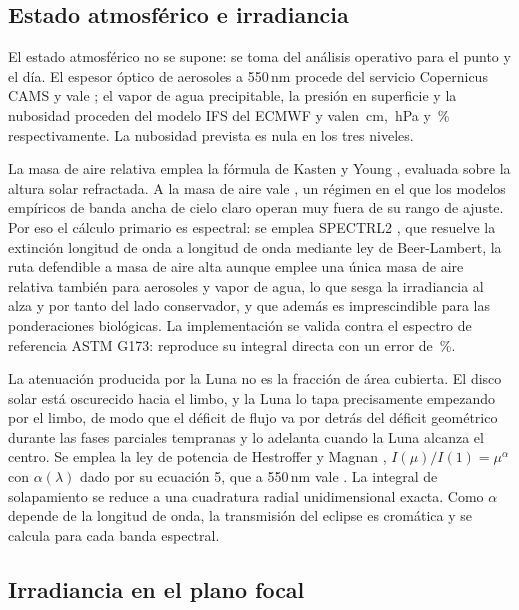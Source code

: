 \documentclass[10pt,a4paper]{article}
\begin{document}
\subsection{Estado atmosférico e irradiancia}

El estado atmosférico no se supone: se toma del análisis operativo para el punto
y el día. El espesor óptico de aerosoles a 550\,nm procede del servicio
Copernicus CAMS y vale \aodFiveFiveZero; el vapor de agua precipitable, la presión en
superficie y la nubosidad proceden del modelo IFS del ECMWF y valen
\pw\,cm, \psurf\,hPa y \cloud\,\% respectivamente. La nubosidad prevista es nula
en los tres niveles.

La masa de aire relativa emplea la fórmula de Kasten y Young
\cite{kastenyoung1989}, evaluada sobre la altura solar refractada. A
\altMax\textdegree{} la masa de aire vale \amMax, un régimen en el que los
modelos empíricos de banda ancha de cielo claro operan muy fuera de su rango de
ajuste. Por eso el cálculo primario es espectral: se emplea SPECTRL2
\cite{birdriordan1984}, que resuelve la extinción longitud de onda a longitud de
onda mediante ley de Beer-Lambert, la ruta defendible a masa de aire alta aunque
emplee una única masa de aire relativa también para aerosoles y vapor de agua,
lo que sesga la irradiancia al alza y por tanto del lado conservador, y que además es imprescindible para las ponderaciones biológicas. La
implementación se valida contra el espectro de referencia ASTM G173: reproduce
su integral directa con un error de \gerr\,\%.

La atenuación producida por la Luna no es la fracción de área cubierta. El
disco solar está oscurecido hacia el limbo, y la Luna lo tapa precisamente
empezando por el limbo, de modo que el déficit de flujo va por detrás del
déficit geométrico durante las fases parciales tempranas y lo adelanta cuando
la Luna alcanza el centro. Se emplea la ley de potencia de Hestroffer y Magnan
\cite{hestroffer1998}, $I(\mu)/I(1) = \mu^\alpha$ con
$\alpha(\lambda)$ dado por su ecuación 5, que a 550\,nm vale \ldAlpha. La
integral de solapamiento se reduce a una cuadratura radial unidimensional
exacta. Como $\alpha$ depende de la longitud de onda, la transmisión del
eclipse es cromática y se calcula para cada banda espectral.

\subsection{Irradiancia en el plano focal}
\end{document}
